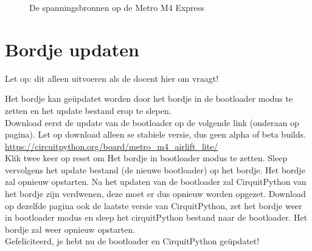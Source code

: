 \begin{figure}[!htb]
	\caption{De spanningsbronnen op de Metro M4 Express}
	\label{fig:MetroM4}
\end{figure}

\clearpage
\newpage

\section{Bordje updaten}

\begin{center}
    Let op: dit alleen uitvoeren als de docent hier om vraagt!
\end{center}

Het bordje kan ge\"{u}pdatet worden door het bordje in de bootloader modus te zetten en het update bestand erop te slepen. \\

Download eerst de update van de bootloader op de volgende link (onderaan op pagina). Let op download alleen se stabiele versie, dus geen alpha of beta builds. \\

\url{https://circuitpython.org/board/metro_m4_airlift_lite/} \\

Klik twee keer op reset om Het bordje in bootloader modus te zetten. Sleep vervolgens het update bestand (de nieuwe bootloader) op het bordje. Het bordje zal opnieuw opstarten. Na het updaten van de bootloader zal CirquitPython van het bordje zijn verdwenen, deze moet er dus opnieuw worden opgezet. Download op dezelfde pagina ook de laatste versie van CirquitPython, zet het bordje weer in bootloader modus en sleep het cirquitPython bestand naar de bootloader. Het bordje zal weer opnieuw opstarten. \\

Gefeliciteerd, je hebt nu de bootloader en CirquitPython ge\"{u}pdatet!

